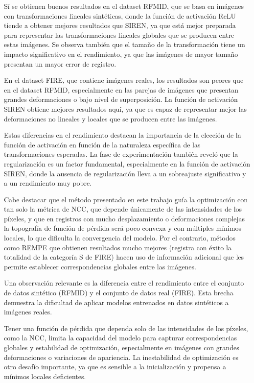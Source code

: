 Sí se obtienen buenos resultados en el dataset RFMID, que se basa en imágenes con transformaciones lineales sintéticas, donde la función de activación ReLU tiende a obtener mejores resultados que SIREN, ya que está mejor preparada para representar las transformaciones lineales globales que se producen entre estas imágenes.
Se observa también que el tamaño de la transformación tiene un impacto significativo en el rendimiento, ya que las imágenes de mayor tamaño presentan un mayor error de registro.

En el dataset FIRE, que contiene imágenes reales, los resultados son peores que en el dataset RFMID, especialmente en las parejas de imágenes que presentan grandes deformaciones o bajo nivel de superposición.
La función de activación SIREN obtiene mejores resultados aquí, ya que es capaz de representar mejor las deformaciones no lineales y locales que se producen entre las imágenes.

Estas diferencias en el rendimiento destacan la importancia de la elección de la función de activación en función de la naturaleza específica de las transformaciones esperadas.
La fase de experimentación también reveló que la regularización es un factor fundamental, especialmente en la función de activación SIREN, donde la ausencia de regularización lleva a un sobreajuste significativo y a un rendimiento muy pobre.

Cabe destacar que el método presentado en este trabajo guía la optimización con tan solo la métrica de NCC, que depende únicamente de las intensidades de los píxeles, y que en registros con mucho desplazamiento o deformaciones complejas la topografía de función de pérdida será poco convexa y con múltiples mínimos locales, lo que dificulta la convergencia del modelo.
Por el contrario, métodos como REMPE \cite{rempe} que obtienen resultados mucho mejores (registra con éxito la totalidad de la categoría S de FIRE) hacen uso de información adicional que les permite establecer correspondencias globales entre las imágenes.

Una observación relevante es la diferencia entre el rendimiento entre el conjunto de datos sintético (RFMID) y el conjunto de datos real (FIRE). Esta brecha demuestra la dificultad de aplicar modelos entrenados en datos sintéticos a imágenes reales.

Tener una función de pérdida que dependa solo de las intensidades de los píxeles, como la NCC, limita la capacidad del modelo para capturar correspondencias globales y estabilidad de optimización, especialmente en imágenes con grandes deformaciones o variaciones de apariencia.
La inestabilidad de optimización es otro desafío importante, ya que es sensible a la inicialización y propensa a mínimos locales deficientes.

